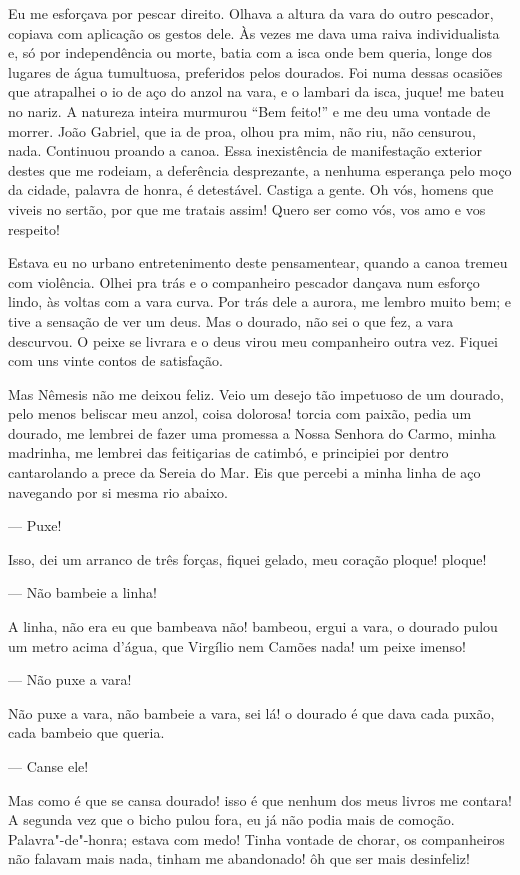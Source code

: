 Eu me esforçava por pescar direito. Olhava a altura da vara do outro
pescador, copiava com aplicação os gestos dele. Às vezes me dava uma
raiva individualista e, só por independência ou morte, batia com a isca
onde bem queria, longe dos lugares de água tumultuosa, preferidos pelos
dourados. Foi numa dessas ocasiões que atrapalhei o io de aço do anzol
na vara, e o lambari da isca, juque! me bateu no nariz. A natureza
inteira murmurou ``Bem feito!'' e me deu uma vontade de morrer. João
Gabriel, que ia de proa, olhou pra mim, não riu, não censurou, nada.
Continuou proando a canoa. Essa inexistência de manifestação exterior
destes que me rodeiam, a deferência desprezante, a nenhuma esperança
pelo moço da cidade, palavra de honra, é detestável. Castiga a gente. Oh
vós, homens que viveis no sertão, por que me tratais assim! Quero ser
como vós, vos amo e vos respeito!

Estava eu no urbano entretenimento deste pensamentear, quando a canoa
tremeu com violência. Olhei pra trás e o companheiro pescador dançava
num esforço lindo, às voltas com a vara curva. Por trás dele a aurora,
me lembro muito bem; e tive a sensação de ver um deus. Mas o dourado,
não sei o que fez, a vara descurvou. O peixe se livrara e o deus virou
meu companheiro outra vez. Fiquei com uns vinte contos de satisfação.

Mas Nêmesis não me deixou feliz. Veio um desejo tão impetuoso de um
dourado, pelo menos beliscar meu anzol, coisa dolorosa! torcia com
paixão, pedia um dourado, me lembrei de fazer uma promessa a Nossa
Senhora do Carmo, minha madrinha, me lembrei das feitiçarias de catimbó,
e principiei por dentro cantarolando a prece da Sereia do Mar. Eis que
percebi a minha linha de aço navegando por si mesma rio abaixo.

--- Puxe!

Isso, dei um arranco de três forças, fiquei gelado, meu coração ploque!
ploque!

--- Não bambeie a linha!

A linha, não era eu que bambeava não! bambeou, ergui a vara, o dourado
pulou um metro acima d'água, que Virgílio nem Camões nada! um peixe
imenso!

--- Não puxe a vara!

Não puxe a vara, não bambeie a vara, sei lá! o dourado é que dava cada
puxão, cada bambeio que queria.

--- Canse ele!

Mas como é que se cansa dourado! isso é que nenhum dos meus livros me
contara! A segunda vez que o bicho pulou fora, eu já não podia mais de
comoção. Palavra"-de"-honra; estava com medo! Tinha vontade de chorar, os
companheiros não falavam mais nada, tinham me abandonado! ôh que ser
mais desinfeliz!

